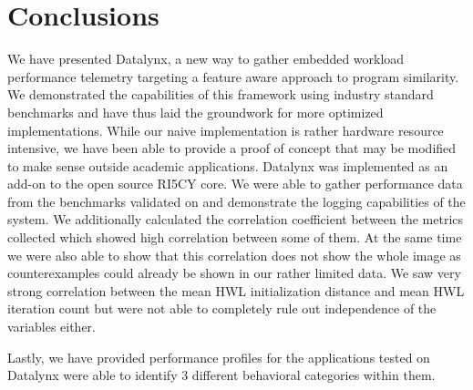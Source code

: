 \documentclass[../bachelor_paper.tex]{subfiles}
\begin{document}
\chapter{Conclusions}
    \label{ch:conc}
    
We have presented Datalynx, a new way to gather embedded workload performance telemetry targeting a feature aware approach to program similarity. We demonstrated the capabilities of this framework using industry standard benchmarks and have thus laid the groundwork for more optimized implementations. While our naive implementation is rather hardware resource intensive, we have been able to provide a proof of concept that may be modified to make sense outside academic applications. Datalynx was implemented as an add-on to the open source RI5CY core. We were able to gather performance data from the benchmarks validated on and demonstrate the logging capabilities of the system. We additionally calculated the correlation coefficient between the metrics collected which showed high correlation between some of them. At the same time we were also able to show that this correlation does not show the whole image as counterexamples could already be shown in our rather limited data. We saw very strong correlation between the mean \ac{HWL} initialization distance and mean \ac{HWL} iteration count but were not able to completely rule out independence of the variables either.

Lastly, we have provided performance profiles for the applications tested on Datalynx were able to identify 3 different behavioral categories within them.

\isstandalone



\fi
\end{document}

